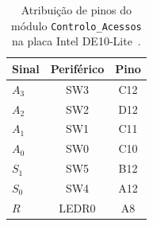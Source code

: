 \documentclass[12pt]{article}
\begin{document}
\renewcommand{\arraystretch}{1.5}
\begin{table}[h]\footnotesize
	\caption{Atribuição de pinos do módulo \texttt{Controlo\_Acessos} na placa Intel DE10-Lite~\cite{de10liteManual}.}
  \centering
	\begin{tabular}{|l|c|c|}
	\hline
	\textbf{Sinal} & \textbf{Periférico} & \textbf{Pino} \\ \hline\hline
	$A_3$ & SW3 & C12  \\
	$A_2$ & SW2 & D12 \\
	$A_1$ & SW1 & C11 \\
	$A_0$ & SW0 & C10 \\ \hline
	$S_1$ & SW5 & B12 \\
	$S_0$ & SW4 & A12 \\ \hline \hline
	$R$   & LEDR0 & A8  \\ \hline
	\end{tabular}
	
	\label{tab:pinos}
\end{table}
\end{document}
